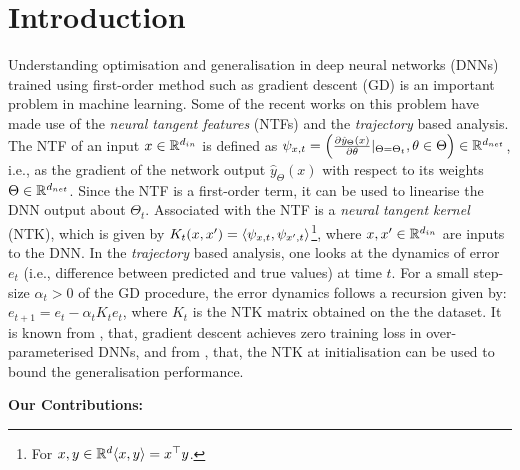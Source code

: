 \section{Introduction}
Understanding optimisation and generalisation in deep neural networks (DNNs) trained using first-order method such as gradient descent (GD) is an important problem in machine learning. Some of the recent works on this problem have made use of the \emph{neural tangent features} (NTFs) and the \emph{trajectory} based analysis. The NTF of an input $x\in \mathbb{R}^{d_{in}}$ is defined as $\psi_{x,t}=\left(\frac{\partial \hat{y}_{\Theta}(x)}{\partial \theta}|_{\Theta=\Theta_t},\theta \in \Theta\right)\in \mathbb{R}^{d_{net}}$, i.e., as the gradient of the network output $\hat{y}_{\Theta}(x)$ with respect to its weights $\Theta\in\mathbb{R}^{d_{net}}$. Since the NTF is a first-order term, it can be used to linearise the DNN output about $\Theta_t$. Associated with the NTF is a \emph{neural tangent kernel} (NTK), which is given by $K_t(x,x')=\langle \psi_{x,t},\psi_{x',t}\rangle$\footnote{For $x,y\in\mathbb{R}^d \langle x,y\rangle=x^\top y$.}, where $x,x'\in\mathbb{R}^{d_{in}}$ are inputs to the DNN. In the \emph{trajectory} based analysis, one looks at the dynamics of error $e_t$  (i.e., difference between predicted and true values) at time $t$. For a small step-size $\alpha_t>0$ of the GD procedure, the error dynamics follows a recursion given by: $e_{t+1}=e_t-\alpha_tK_te_t$, where $K_t$ is the NTK matrix obtained on the the dataset. It is known from \cite{dudnn}, that, gradient descent achieves zero training loss in over-parameterised DNNs, and from \cite{cao2019generalization}, that, the NTK at initialisation can be used to bound the generalisation performance.\\
\begin{comment}
 the following questions still remain unresolved \hfill\\
\textbf{Question I (Optimisation):} \emph{What is the role of width and depth in training of DNNs? Why increasing depth till a point helps in training? Why increasing the depth beyond hurts training?}\\
The results by \cite{dudnn} only throw light on why ResNets could be better than fully connected DNNs. The above question in relation to fully connected networks is still unresolved.\\
\textbf{Question II (Generalisation):} \emph{What are the hidden features in a DNN? Are these features learned? and if so, how?} \hfill\\
There are couple of unresolved issues in prior work by \cite{arora2019exact,cao2019generalization}. Firstly, if the DNNs are only linear learners with random NTFs, then it means that, no feature learning happens in DNNs. Secondly, it was observed in prior experiments, that, the DNNs perform better than their corresponding NTK counterparts \cite{arora2019exact,lee2019wide}. \hfill\\
\end{comment}
\textbf{Our Contributions:} 


